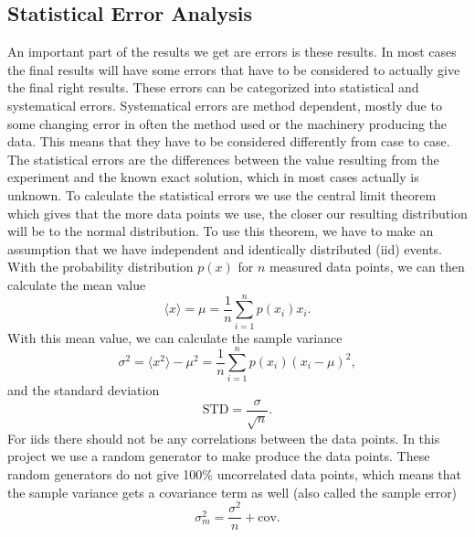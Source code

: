 \documentclass[12pt,a4paper,english]{article}
\begin{document}
\subsection{Statistical Error Analysis}
\label{subsect:Error_analysis}
An important part of the results we get are errors is these results. In most cases the final results will have some errors that have to be considered to actually give the final right results. These errors can be categorized into statistical and systematical errors. Systematical errors are method dependent, mostly due to some changing error in often the method used or the machinery producing the data. This means that they have to be considered differently from case to case. The statistical errors are the differences between the value resulting from the experiment and the known exact solution, which in most cases actually is unknown. To calculate the statistical errors we use the central limit theorem which gives that the more data points we use, the closer our resulting distribution will be to the normal distribution. To use this theorem, we have to make an assumption that we have independent and identically distributed (iid) events. With the probability distribution $p(x)$ for $n$ measured data points, we can then calculate the mean value
\begin{equation}
\label{eq:stat_mean}
\langle x \rangle =\mu=\frac{1}{n}\sum_{i=1}^{n}p(x_i)x_i.
\end{equation}
With this mean value, we can calculate the sample variance 
\begin{equation}
\label{eq:stat_ar}
\sigma^2=\langle x^2 \rangle-\mu^2=\frac{1}{n}\sum_{i=1}^{n}p(x_i)(x_i-\mu)^2,
\end{equation}
and the standard deviation
\begin{equation}
\label{eq:stat_STD}
\text{STD}=\frac{\sigma}{\sqrt{n}}.
\end{equation}
For iids there should not be any correlations between the data points. In this project we use a random generator to make produce the data points. These random generators do not give 100\% uncorrelated data points, which means that the sample variance gets a covariance term as well (also called the sample error)
\begin{equation}
\label{eq:stat_var_cov}
\sigma_m^2=\frac{\sigma^2}{n}+\text{cov}.
\end{equation}
\end{document}
